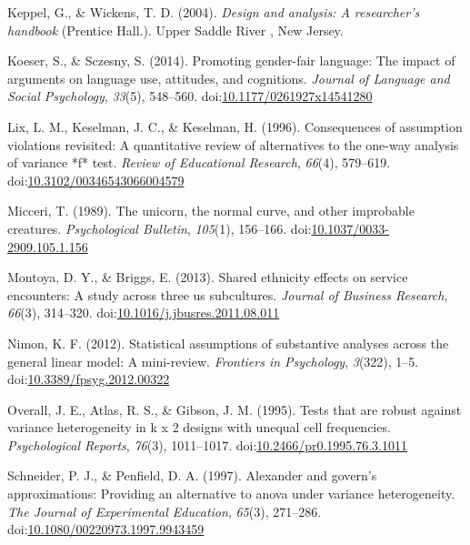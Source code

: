 \documentclass[man,floatsintext]{apa6}
\begin{document}
\hypertarget{ref-Keppel_and_Wickens_2004}{}
Keppel, G., \& Wickens, T. D. (2004). \emph{Design and analysis: A
researcher's handbook} (Prentice Hall.). Upper Saddle River , New
Jersey.

\hypertarget{ref-Koeser_and_Sczesny_2014}{}
Koeser, S., \& Sczesny, S. (2014). Promoting gender-fair language: The
impact of arguments on language use, attitudes, and cognitions.
\emph{Journal of Language and Social Psychology}, \emph{33}(5),
548--560.
doi:\href{https://doi.org/10.1177/0261927x14541280}{10.1177/0261927x14541280}

\hypertarget{ref-Lix_Keselman_Keselman_1996}{}
Lix, L. M., Keselman, J. C., \& Keselman, H. (1996). Consequences of
assumption violations revisited: A quantitative review of alternatives
to the one-way analysis of variance *f* test. \emph{Review of
Educational Research}, \emph{66}(4), 579--619.
doi:\href{https://doi.org/10.3102/00346543066004579}{10.3102/00346543066004579}

\hypertarget{ref-Micceri_1989}{}
Micceri, T. (1989). The unicorn, the normal curve, and other improbable
creatures. \emph{Psychological Bulletin}, \emph{105}(1), 156--166.
doi:\href{https://doi.org/10.1037/0033-2909.105.1.156}{10.1037/0033-2909.105.1.156}

\hypertarget{ref-Montoya_Briggs_2013}{}
Montoya, D. Y., \& Briggs, E. (2013). Shared ethnicity effects on
service encounters: A study across three us subcultures. \emph{Journal
of Business Research}, \emph{66}(3), 314--320.
doi:\href{https://doi.org/10.1016/j.jbusres.2011.08.011}{10.1016/j.jbusres.2011.08.011}

\hypertarget{ref-Nimon_2012}{}
Nimon, K. F. (2012). Statistical assumptions of substantive analyses
across the general linear model: A mini-review. \emph{Frontiers in
Psychology}, \emph{3}(322), 1--5.
doi:\href{https://doi.org/10.3389/fpsyg.2012.00322}{10.3389/fpsyg.2012.00322}

\hypertarget{ref-Overall_et_al_1995}{}
Overall, J. E., Atlas, R. S., \& Gibson, J. M. (1995). Tests that are
robust against variance heterogeneity in k x 2 designs with unequal cell
frequencies. \emph{Psychological Reports}, \emph{76}(3), 1011--1017.
doi:\href{https://doi.org/10.2466/pr0.1995.76.3.1011}{10.2466/pr0.1995.76.3.1011}

\hypertarget{ref-Schneider_and_Penfield_1997}{}
Schneider, P. J., \& Penfield, D. A. (1997). Alexander and govern's
approximations: Providing an alternative to anova under variance
heterogeneity. \emph{The Journal of Experimental Education},
\emph{65}(3), 271--286.
doi:\href{https://doi.org/10.1080/00220973.1997.9943459}{10.1080/00220973.1997.9943459}
\end{document}
